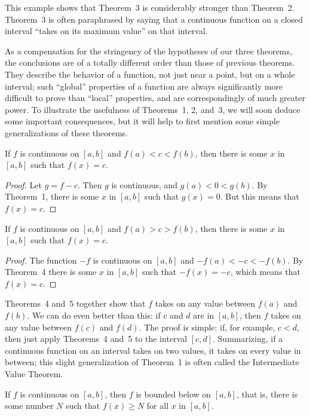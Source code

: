 This example shows that Theorem~3 is considerably stronger than Theorem~2.
Theorem~3 is often paraphrased by saying that a continuous function on a closed
interval ``takes on its maximum value'' on that interval.

As a compensation for the stringency of the hypotheses of our three theorems,
the conclusions are of a totally different order than those of previous
theorems. They describe the behavior of a function, not just near a point, but
on a whole interval; such ``global'' properties of a function are always
significantly more difficult to prove than ``local'' properties, and are
correspondingly of much greater power. To illustrate the usefulness of
Theorems~1, 2, and~3, we will soon deduce some important consequences, but it
will help to first mention some simple generalizations of these theorems.

\begin{theorem}
If $f$ is continuous on $[a,b]$ and $f(a)<c<f(b)$, then there is some $x$ in
$[a,b]$ such that $f(x)=c$.
\end{theorem}

\begin{proof}
Let $g=f-c$. Then $g$ is continuous, and $g(a)<0<g(b)$. By Theorem~1, there is
some $x$ in $[a,b]$ such that $g(x)=0$. But this means that $f(x)=c$.
\end{proof}

\begin{theorem}
If $f$ is continuous on $[a,b]$ and $f(a)>c>f(b)$, then there is some $x$ in
$[a,b]$ such that $f(x)=c$.
\end{theorem}

\begin{proof}
The function $-f$ is continuous on $[a,b]$ and $-f(a)<-c<-f(b)$. By Theorem~4
there is some $x$ in $[a,b]$ such that $-f(x)=-c$, which means that $f(x)=c$.
\end{proof}

Theorems~4 and~5 together show that $f$ takes on any value between $f(a)$ and
$f(b)$. We can do even better than this: if $c$ and $d$ are in $[a,b]$, then
$f$ takes on any value between $f(c)$ and $f(d)$. The proof is simple: if, for
example, $c<d$, then just apply Theorems~4 and~5 to the interval $[c,d]$.
Summarizing, if a continuous function on an interval takes on two values, it
takes on every value in between; this slight generalization of Theorem~1 is
often called the Intermediate Value Theorem.

\begin{theorem}
If $f$ is continuous on $[a,b]$, then $f$ is bounded below on $[a,b]$, that is,
there is some number $N$ such that $f(x)\geq N$ for all $x$ in $[a,b]$.
\end{theorem}

